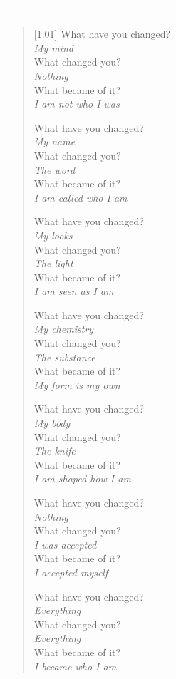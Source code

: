 \newpage
\subsection{---}

\begin{verse}[1.01\textwidth]
What have you changed?\\
\vin \emph{My mind}\\
What changed you?\\
\vin \emph{Nothing}\\
What became of it?\\
\vin \emph{I am not who I was}

What have you changed?\\
\vin \emph{My name}\\
What changed you?\\
\vin \emph{The word}\\
What became of it?\\
\vin \emph{I am called who I am}

What have you changed?\\
\vin \emph{My looks}\\
What changed you?\\
\vin \emph{The light}\\
What became of it?\\
\vin \emph{I am seen as I am}

What have you changed?\\
\vin \emph{My chemistry}\\
What changed you?\\
\vin \emph{The substance}\\
What became of it?\\
\vin \emph{My form is my own}

\newpage
\null
\vspace{0.01em}

What have you changed?\\
\vin \emph{My body}\\
What changed you?\\
\vin \emph{The knife}\\
What became of it?\\
\vin \emph{I am shaped how I am}

What have you changed?\\
\vin \emph{Nothing}\\
What changed you?\\
\vin \emph{I was accepted}\\
What became of it?\\
\vin \emph{I accepted myself}

What have you changed?\\
\vin \emph{Everything}\\
What changed you?\\
\vin \emph{Everything}\\
What became of it?\\
\vin \emph{I became who I am}
\end{verse}
